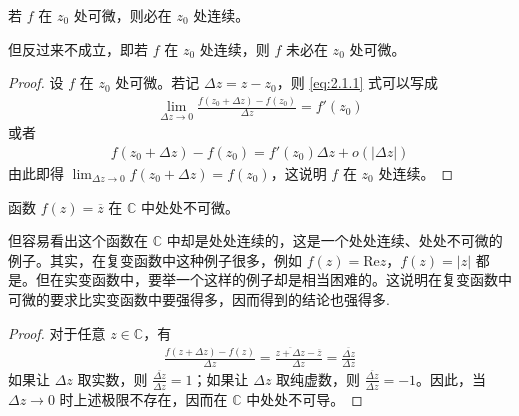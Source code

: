 \documentclass[../../main.tex]{subfiles}%
\begin{document}
\begin{proposition}\label{proposition:全纯函数必连续}
若 \( f \) 在 \( z_0 \) 处可微，则必在 \( z_0 \) 处连续。
\end{proposition}
\begin{remark}
但反过来不成立，即若 \( f \) 在 \( z_0 \) 处连续，则 \( f \) 未必在 \( z_0 \) 处可微。
\end{remark}
\begin{proof}

设 \( f \) 在 \( z_0 \) 处可微。若记 \( \Delta z = z - z_0 \)，则 \eqref{eq:2.1.1} 式可以写成
\begin{align*}
\lim_{\Delta z \to 0} \frac{f(z_0 + \Delta z) - f(z_0)}{\Delta z} = f'(z_0)
\end{align*}
或者
\begin{align}
f(z_0 + \Delta z) - f(z_0) = f'(z_0)\Delta z + o(|\Delta z|) \label{eq:2.1.2}
\end{align}
由此即得 \( \lim_{\Delta z \to 0} f(z_0 + \Delta z) = f(z_0) \)，这说明 \( f \) 在 \( z_0 \) 处连续。

\end{proof}

\begin{example}
函数 \( f(z) = \overline{z} \) 在 \( \mathbb{C} \) 中处处不可微。
\end{example}
\begin{remark}
但容易看出这个函数在 \( \mathbb{C} \) 中却是处处连续的，这是一个处处连续、处处不可微的例子。其实，在复变函数中这种例子很多，例如 \( f(z) = \text{Re}z \)，\( f(z) = |z| \) 都是。但在实变函数中，要举一个这样的例子却是相当困难的。这说明在复变函数中可微的要求比实变函数中要强得多，因而得到的结论也强得多.
\end{remark}
\begin{proof}

对于任意 \( z \in \mathbb{C} \)，有
\begin{align*}
\frac{f(z + \Delta z) - f(z)}{\Delta z} = \frac{\overline{z + \Delta z} - \overline{z}}{\Delta z} = \frac{\overline{\Delta z}}{\Delta z}
\end{align*}
如果让 \( \Delta z \) 取实数，则 \( \frac{\overline{\Delta z}}{\Delta z} = 1 \)；如果让 \( \Delta z \) 取纯虚数，则 \( \frac{\overline{\Delta z}}{\Delta z} = -1 \)。因此，当 \( \Delta z \to 0 \) 时上述极限不存在，因而在 \( \mathbb{C} \) 中处处不可导。

\end{proof}
\end{document}
